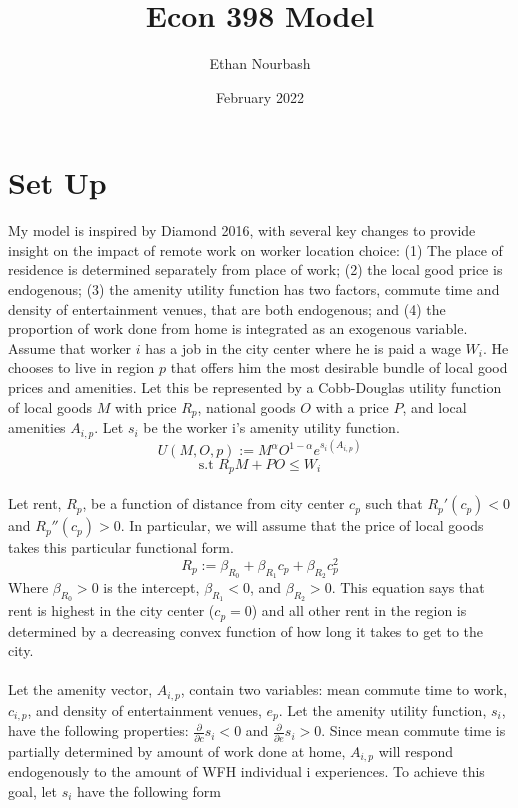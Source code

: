 \documentclass{article}
\title{Econ 398 Model}
\author{Ethan Nourbash}
\date{February 2022}
\begin{document}
\maketitle

\section{Set Up}
My model is inspired by Diamond 2016, with several key changes to provide insight on the impact of remote work on worker location choice: (1) The place of residence is determined separately from place of work; (2) the local good price is endogenous; (3) the amenity utility function has two factors, commute time and density of entertainment venues, that are both endogenous; and (4) the proportion of work done from home is integrated as an exogenous variable.\\
Assume that worker $i$ has a job in the city center where he is paid a wage $W_{i}$. He chooses to live in region $p$ that offers him the most desirable bundle of local good prices and amenities. Let this be represented by a Cobb-Douglas utility function of local goods $M$ with price $R_{p}$, national goods $O$ with a price $P$, and local amenities $A_{i,p}$. Let $s_i$ be the worker i's amenity utility function.
\begin{equation}
U(M, O, p) := M^\alpha O^{1-\alpha}e^{s_i(A_{i,p})}
\end{equation}
\begin{equation}
\textrm{s.t } R_{p}M + PO \leq W_{i}
\end{equation}
\\
Let rent, $R_{p}$, be a function of distance from city center $c_p$ such that $R_{p}'(c_p) < 0$ and $R_{p}''(c_p) > 0$. In particular, we will assume that the price of local goods takes this particular functional form.
\begin{equation} \label{rent}
R_{p} := \beta_{R_0} + \beta_{R_1} c_p + \beta_{R_2} c_p^2
\end{equation}
Where $\beta_{R_0} > 0$ is the intercept, $\beta_{R_1} < 0$, and $\beta_{R_2} > 0$. This equation says that rent is highest in the city center ($c_p = 0$) and all other rent in the region is determined by a decreasing convex function of how long it takes to get to the city.\\ \\
Let the amenity vector, $A_{i,p}$, contain two variables: mean commute time to work, $c_{i,p}$, and density of entertainment venues, $e_{p}$. Let the amenity utility function, $s_{i}$, have the following properties: $\frac{\partial}{\partial c}s_{i}<0$ and $\frac{\partial}{\partial e}s_{i}>0$. Since mean commute time is partially determined by amount of work done at home, $A_{i,p}$ will respond endogenously to the amount of WFH individual i experiences. To achieve this goal, let $s_i$ have the following form
\end{document}
